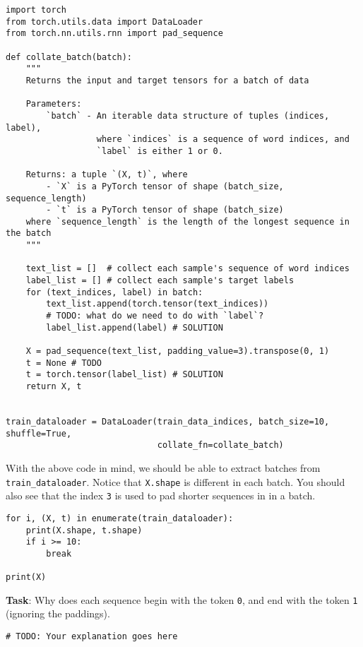 \documentclass[
  letterpaper,
  DIV=11,
  numbers=noendperiod]{scrartcl}
\begin{document}
\begin{verbatim}
import torch
from torch.utils.data import DataLoader
from torch.nn.utils.rnn import pad_sequence

def collate_batch(batch):
    """
    Returns the input and target tensors for a batch of data

    Parameters:
        `batch` - An iterable data structure of tuples (indices, label),
                  where `indices` is a sequence of word indices, and 
                  `label` is either 1 or 0.

    Returns: a tuple `(X, t)`, where 
        - `X` is a PyTorch tensor of shape (batch_size, sequence_length)
        - `t` is a PyTorch tensor of shape (batch_size)
    where `sequence_length` is the length of the longest sequence in the batch
    """

    text_list = []  # collect each sample's sequence of word indices
    label_list = [] # collect each sample's target labels
    for (text_indices, label) in batch:
        text_list.append(torch.tensor(text_indices))
        # TODO: what do we need to do with `label`?
        label_list.append(label) # SOLUTION

    X = pad_sequence(text_list, padding_value=3).transpose(0, 1)
    t = None # TODO
    t = torch.tensor(label_list) # SOLUTION
    return X, t


train_dataloader = DataLoader(train_data_indices, batch_size=10, shuffle=True,
                              collate_fn=collate_batch)
\end{verbatim}

With the above code in mind, we should be able to extract batches from
\texttt{train\_dataloader}. Notice that \texttt{X.shape} is different in
each batch. You should also see that the index \texttt{3} is used to pad
shorter sequences in in a batch.

\begin{verbatim}
for i, (X, t) in enumerate(train_dataloader):
    print(X.shape, t.shape)
    if i >= 10:
        break

print(X)
\end{verbatim}

\textbf{Task}: Why does each sequence begin with the token \texttt{0},
and end with the token \texttt{1} (ignoring the paddings).

\begin{verbatim}
# TODO: Your explanation goes here
\end{verbatim}
\end{document}
